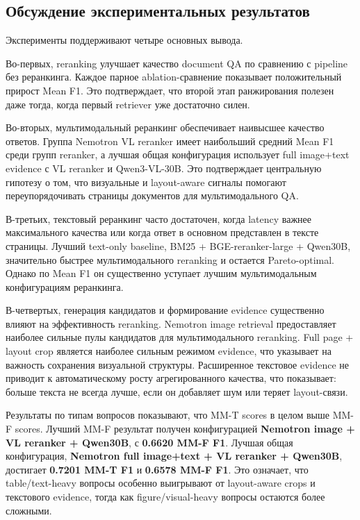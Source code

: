 \documentclass[conference]{IEEEtran}
\begin{document}
\subsection{Обсуждение экспериментальных результатов}

Эксперименты поддерживают четыре основных вывода.

Во-первых, reranking улучшает качество document QA по сравнению с pipeline без реранкинга. Каждое парное ablation-сравнение показывает положительный прирост Mean F1. Это подтверждает, что второй этап ранжирования полезен даже тогда, когда первый retriever уже достаточно силен.

Во-вторых, мультимодальный реранкинг обеспечивает наивысшее качество ответов. Группа Nemotron VL reranker имеет наибольший средний Mean F1 среди групп reranker, а лучшая общая конфигурация использует full image+text evidence с VL reranker и Qwen3-VL-30B. Это подтверждает центральную гипотезу о том, что визуальные и layout-aware сигналы помогают переупорядочивать страницы документов для мультимодального QA.

В-третьих, текстовый реранкинг часто достаточен, когда latency важнее максимального качества или когда ответ в основном представлен в тексте страницы. Лучший text-only baseline, BM25 + BGE-reranker-large + Qwen30B, значительно быстрее мультимодального reranking и остается Pareto-optimal. Однако по Mean F1 он существенно уступает лучшим мультимодальным конфигурациям реранкинга.

В-четвертых, генерация кандидатов и формирование evidence существенно влияют на эффективность reranking. Nemotron image retrieval предоставляет наиболее сильные пулы кандидатов для мультимодального reranking. Full page + layout crop является наиболее сильным режимом evidence, что указывает на важность сохранения визуальной структуры. Расширенное текстовое evidence не приводит к автоматическому росту агрегированного качества, что показывает: больше текста не всегда лучше, если он добавляет шум или теряет layout-связи.

Результаты по типам вопросов показывают, что MM-T scores в целом выше MM-F scores. Лучший MM-F результат получен конфигурацией \textbf{Nemotron image + VL reranker + Qwen30B}, с \textbf{0.6620 MM-F F1}. Лучшая общая конфигурация, \textbf{Nemotron full image+text + VL reranker + Qwen30B}, достигает \textbf{0.7201 MM-T F1} и \textbf{0.6578 MM-F F1}. Это означает, что table/text-heavy вопросы особенно выигрывают от layout-aware crops и текстового evidence, тогда как figure/visual-heavy вопросы остаются более сложными.
\end{document}
